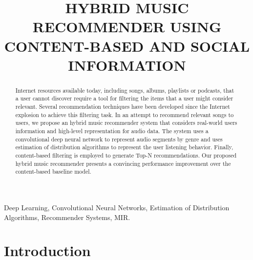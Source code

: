 \documentclass{article}
\title{HYBRID MUSIC RECOMMENDER USING CONTENT-BASED AND SOCIAL INFORMATION}
\begin{document}
%
\maketitle
%
\begin{abstract}
Internet resources available today, including songs, albums, playlists or podcasts, that a user cannot discover require a tool for filtering the items that a user might consider relevant. Several recommendation techniques have been developed since the Internet explosion to achieve this filtering task. In an attempt to recommend relevant songs to users, we propose an hybrid music recommender system that considers real-world users information and high-level representation for audio data. The system uses a convolutional deep neural network to represent audio segments by genre and uses estimation of distribution algorithms to represent the user listening behavior. Finally, content-based filtering is employed to generate Top-N recommendations. Our proposed hybrid music recommender presents a convincing performance improvement over the  content-based baseline model.
\end{abstract}
%
\begin{keywords}
	Deep Learning, Convolutional Neural Networks, Estimation of Distribution Algorithms, Recommender Systems, MIR.

\end{keywords}
%
\section{Introduction}
\label{sec:intro}
\end{document}
